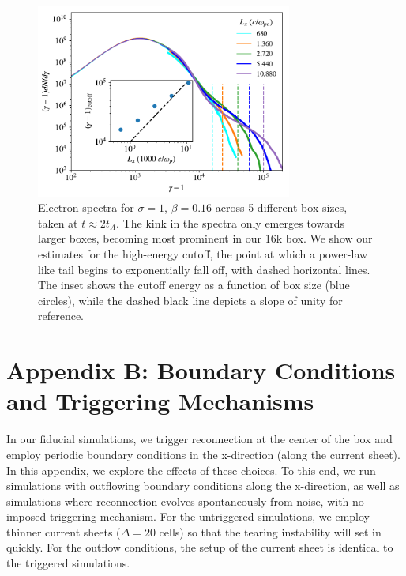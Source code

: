 \begin{figure}[t]
\centering
\includegraphics[width =0.75\textwidth]{sig1_delgam_2_boxsize.pdf}
\caption{Electron spectra for $\sigma=1$, $\beta=0.16$ across 5 different box sizes, taken at $t\approx 2t_{A}$.  The kink in the spectra only emerges towards larger boxes, becoming most prominent in our 16k box.  We show our estimates for the high-energy cutoff, the point at which a power-law like tail begins to exponentially fall off, with dashed horizontal lines.  The inset shows the cutoff energy as a function of box size (blue circles), while the dashed black line depicts a slope of unity for reference.}
\label{sig1_boxsize}
\end{figure}

\section{Appendix B: Boundary Conditions and Triggering Mechanisms}\label{untriggered}
In our fiducial simulations, we trigger reconnection at the center of the box and employ periodic boundary conditions in the x-direction (along the current sheet).  In this appendix, we explore the effects of these choices.  To this end, we run simulations with outflowing boundary conditions along the x-direction, as well as simulations where reconnection evolves spontaneously from noise, with no imposed triggering mechanism.  For the untriggered simulations, we employ thinner current sheets ($\Delta=20$ cells) so that the tearing instability will set in quickly.  For the outflow conditions, the setup of the current sheet is identical to the triggered simulations.

